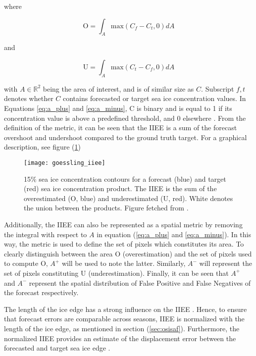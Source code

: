 \documentclass[../main/thesis.tex]{subfiles}
\begin{document}
where 

\begin{equation}
    \label{eq:a_plus}
    \text{O} = \int_A\text{max}(C_f - C_t, 0)dA
\end{equation}

and

\begin{equation}
    \label{eq:a_minus}
    \text{U} = \int_A\text{max}(C_t - C_f, 0)dA
\end{equation}

with $A \in{\mathbb{R}^2}$ being the area of interest, and is of similar size as $C$. Subscript $f,t$ denotes whether $C$ contains forecasted or target sea ice concentration values. In Equations \ref{eq:a_plus} and \ref{eq:a_minus}, C is binary and is equal to 1 if its concentration value is above a predefined threshold, and 0 elsewhere \citep{Goessling2016}. From the definition of the metric, it can be seen that the IIEE is a sum of the forecast overshoot and undershoot compared to the ground truth target. For a graphical description, see figure (\ref{fig:goessling_iiee})

\begin{figure}
    \centering
    \texttt{[image: goessling\_iiee]}
    \caption{\label{fig:goessling_iiee}15\% sea ice concentration contours for a forecast (blue) and target (red) sea ice concentration product. The IIEE is the sum of the overestimated (O, blue) and underestimated (U, red). White denotes the union between the products. Figure fetched from \protect\citep{Goessling2016}.}
\end{figure}

Additionally, the IIEE can also be represented as a spatial metric by removing the integral with respect to $A$ in equation (\ref{eq:a_plus} and \ref{eq:a_minus}). In this way, the metric is used to define the set of pixels which constitutes its area. To clearly distinguish between the area O (overestimation) and the set of pixels used to compute O, $A^+$ will be used to note the latter. Similarly, $A^-$ will represent the set of pixels constituting U (underestimation). Finally, it can be seen that $A^+$ and $A^-$ represent the spatial distribution of False Positive and False Negatives of the forecast respectively.

The length of the ice edge has a strong influence on the IIEE \citep{Goessling2018,Palerme2019}. Hence, to ensure that forecast errors are comparable across seasons, IIEE is normalized with the length of the ice edge, as mentioned in section (\ref{sec:osisaf}). Furthermore, the normalized IIEE provides an estimate of the displacement error between the forecasted and target sea ice edge \citep{Melsom2019}.
\end{document}
